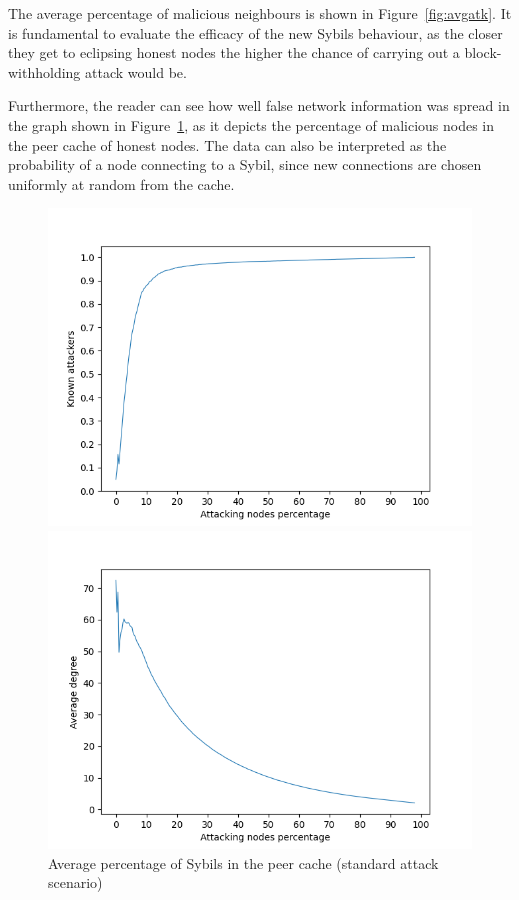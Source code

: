 The average percentage of malicious neighbours is shown in Figure~\ref{fig:avgatk}. It is fundamental to evaluate the efficacy of the new Sybils behaviour, as the closer they get to eclipsing honest nodes the higher the chance of carrying out a block-withholding attack would be.\par

Furthermore, the reader can see how well false network information was spread in the graph shown in Figure~\ref{fig:avgatk-known}, as it depicts the percentage of malicious nodes in the peer cache of honest nodes. The data can also be interpreted as the probability of a node connecting to a Sybil, since new connections are chosen uniformly at random from the cache.\par

    \begin{figure}[ht]
        \begin{minipage}[b]{0.5\linewidth}
            \includegraphics[width=1.1\textwidth]{pict/results/in-hon-avg-known-atk.png}
			\centering
			\caption{Average percentage of Sybils in the peer cache (standard attack scenario)}
			\label{fig:avgatk-known}
        \end{minipage}
        \hspace{0.5cm}
        \begin{minipage}[b]{0.5\linewidth}
			\includegraphics[width=1.1\textwidth]{pict/results/in-atk-avg-degree.png}

\end{minipage}
\end{figure}

